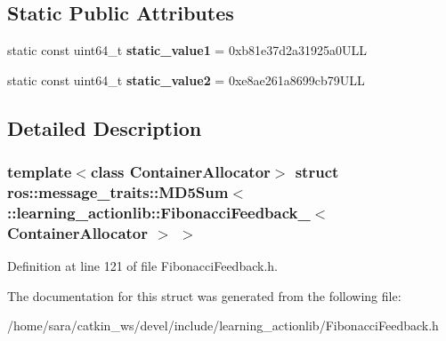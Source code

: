 \subsection*{Static Public Attributes}
\begin{DoxyCompactItemize}
\item 
\mbox{\label{structros_1_1message__traits_1_1MD5Sum_3_01_1_1learning__actionlib_1_1FibonacciFeedback___3_01ContainerAllocator_01_4_01_4_ab026016a48ed49943ecc72e9d3c77b3e}} 
static const uint64\+\_\+t {\bfseries static\+\_\+value1} = 0xb81e37d2a31925a0\+U\+LL
\item 
\mbox{\label{structros_1_1message__traits_1_1MD5Sum_3_01_1_1learning__actionlib_1_1FibonacciFeedback___3_01ContainerAllocator_01_4_01_4_ac6d883a7add899dbcb54893f74fd37ca}} 
static const uint64\+\_\+t {\bfseries static\+\_\+value2} = 0xe8ae261a8699cb79\+U\+LL
\end{DoxyCompactItemize}


\subsection{Detailed Description}
\subsubsection*{template$<$class Container\+Allocator$>$\newline
struct ros\+::message\+\_\+traits\+::\+M\+D5\+Sum$<$ \+::learning\+\_\+actionlib\+::\+Fibonacci\+Feedback\+\_\+$<$ Container\+Allocator $>$ $>$}



Definition at line 121 of file Fibonacci\+Feedback.\+h.



The documentation for this struct was generated from the following file\+:\begin{DoxyCompactItemize}
\item 
/home/sara/catkin\+\_\+ws/devel/include/learning\+\_\+actionlib/Fibonacci\+Feedback.\+h\end{DoxyCompactItemize}
